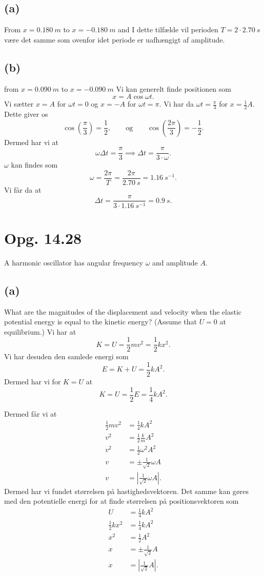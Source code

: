 \documentclass[12pt]{article}
\theoremstyle{definition}
\begin{document}
\subsection*{(a)}
From $x = \qty{0,180}{m}$ to $x = -\qty{0,180}{m}$ and
\bigbreak
I dette tilfælde vil perioden $T = 2 \cdot \qty{2,70}{s}$ være det samme som ovenfor idet periode er uafhængigt af amplitude. 


\subsection*{(b)}
from $x = \qty{0,090}{m}$ to $x = -\qty{0,090}{m}$
\bigbreak
Vi kan generelt finde positionen som
\[ 
x = A \cos \omega t
.\]
Vi sætter $x = A$ for $\omega t = 0$ og $x = -A$ for $\omega t = \pi$. Vi har da $\omega t = \frac{\pi}{3}$ for $x = \frac{1}{2}A$. Dette giver os
\[ 
\cos \left( \frac{\pi}{3} \right) = \frac{1}{2}, \qquad \text{og} \qquad \cos \left( \frac{2\pi}{3} \right) = -\frac{1}{2}
.\]
Dermed har vi at
\[ 
\omega \Delta t = \frac{\pi}{3} \implies \Delta t = \frac{\pi}{3\cdot \omega}
.\]
$\omega$ kan findes som
\[ 
\omega = \frac{2\pi}{T} = \frac{2\pi}{\qty{2,70}{s}} = \qty{1,16}{s^{-1}}
.\]
Vi får da at
\[ 
\Delta t = \frac{\pi}{3 \cdot \qty{1,16}{s^{-1}}} = \qty{0,9}{s} 
.\]



\section*{Opg. 14.28}
A harmonic oscillator has angular frequency $\omega$ and amplitude $A$.

\subsection*{(a)}
What are the magnitudes of the displacement and velocity when the elastic potential energy is equal to the kinetic energy? (Assume that $U = 0$ at equilibrium.)
\bigbreak
Vi har at
\[ 
K = U = \frac{1}{2}mv^2 = \frac{1}{2}kx^2
.\]
Vi har desuden den samlede energi som
\[ 
E = K + U = \frac{1}{2}kA^2
.\]
Dermed har vi for $K = U$ at
\[
  K = U = \frac{1}{2} E = \frac{1}{4} kA^2
.\]

Dermed får vi at
\begin{align*}
  \frac{1}{2}mv^2 &= \frac{1}{4}kA^2 \\
  v^2 &= \frac{1}{2} \frac{k}{m} A^2 \\
  v^2 &= \frac{1}{2} \omega^2 A^2 \\
  v &= \pm \frac{1}{\sqrt{2}} \omega A \\
  v &= \left| \frac{1}{\sqrt{2}}\omega A \right|
.\end{align*}
Dermed har vi fundet størrelsen på hastighedsvektoren. Det samme kan gøres med den potentielle energi for at finde størrelsen på positionsvektoren som
\begin{align*}
  U &= \frac{1}{4}kA^2 \\
  \frac{1}{2}kx^2 &= \frac{1}{4}kA^2 \\
  x^2 &= \frac{1}{2} A^2 \\
  x &= \pm \frac{1}{\sqrt{2}}A \\
  x &= \left| \frac{1}{\sqrt{2}}A \right|
.\end{align*}
\end{document}
